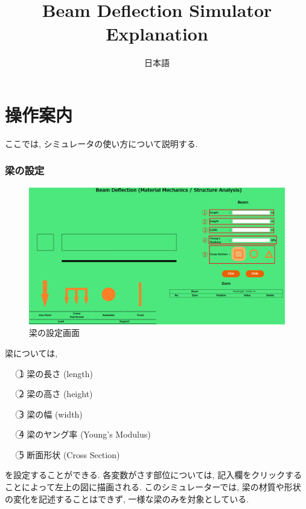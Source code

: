 \documentclass{jsarticle}
\begin{document}
\title{Beam Deflection Simulator Explanation}
\author{日本語}
\maketitle
\newpage

\tableofcontents

\newpage

\part{操作案内}
ここでは, シミュレータの使い方について説明する.

\newpage
\section{梁の設定}

\begin{figure}[H]
\begin{center}
\includegraphics[width=15cm]{Beam_Setting.png}
\caption{梁の設定画面}
\end{center}
\end{figure}

梁については,
\begin{itemize}
\item[\textcircled{\scriptsize 1}] 梁の長さ (length)
\item[\textcircled{\scriptsize 2}] 梁の高さ (height)
\item[\textcircled{\scriptsize 3}] 梁の幅 (width)
\item[\textcircled{\scriptsize 4}] 梁のヤング率 (Young's Modulus)
\item[\textcircled{\scriptsize 5}] 断面形状 (Cross Section)
\end{itemize}
を設定することができる. 各変数がさす部位については, 記入欄をクリックすることによって左上の図に描画される. このシミュレーターでは, 梁の材質や形状の変化を記述することはできず, 一様な梁のみを対象としている.
\end{document}
